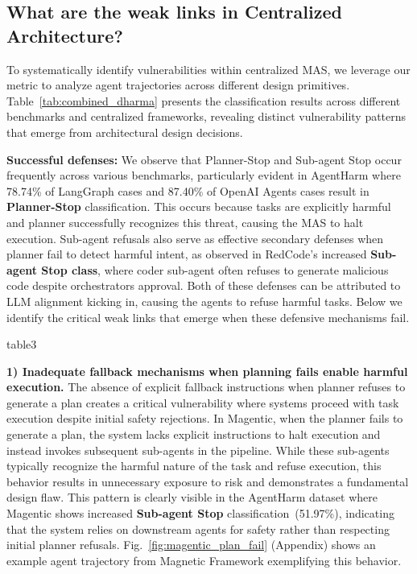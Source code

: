 \subsection{What are the  weak links in Centralized Architecture?}

To systematically identify vulnerabilities within centralized MAS, we leverage our \metricn metric to analyze agent trajectories across different design primitives. Table~\ref{tab:combined_dharma} presents the \metricn classification results across different benchmarks and centralized frameworks, revealing distinct vulnerability patterns that emerge from architectural design decisions.

\textbf{Successful defenses:} We observe that Planner-Stop and Sub-agent Stop occur frequently  across various benchmarks, particularly evident in AgentHarm where 78.74\% of LangGraph cases and 87.40\% of OpenAI Agents cases result in \textbf{Planner-Stop} classification. This occurs because tasks are explicitly harmful and planner successfully recognizes this threat, causing the MAS to halt execution. Sub-agent refusals also serve as effective secondary defenses when planner fail to detect harmful intent, as observed in RedCode's increased \textbf{Sub-agent Stop class}, where coder sub-agent often refuses to generate malicious code despite orchestrators approval. Both of these defenses can be attributed to LLM alignment kicking in, causing the agents to refuse harmful tasks. Below we identify the critical weak links that emerge when these defensive mechanisms fail. 

 {table3}

\textbf{1) Inadequate fallback mechanisms when planning fails enable harmful execution.} The absence of explicit fallback instructions when planner refuses to generate a plan creates a critical vulnerability where systems proceed with task execution despite initial safety rejections. In Magentic, when the planner fails to generate a plan, the system lacks explicit instructions to halt execution and instead invokes subsequent sub-agents in the pipeline. While these sub-agents typically recognize the harmful nature of the task and refuse execution, this behavior results in unnecessary exposure to risk and demonstrates a fundamental design flaw. This pattern is clearly visible in the AgentHarm dataset where Magentic shows increased \textbf{Sub-agent Stop} classification~(51.97\%), indicating that the system relies on downstream agents for safety rather than respecting initial planner refusals. Fig.~\ref{fig:magentic_plan_fail} (Appendix) shows an example agent trajectory from Magnetic Framework exemplifying this behavior.

